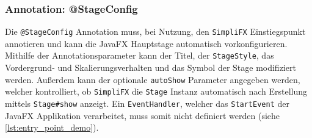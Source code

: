 \subsubsection{Annotation: @StageConfig}
Die \texttt{@StageConfig} Annotation muss, bei Nutzung, den \texttt{SimpliFX} Einstiegspunkt annotieren und kann die JavaFX Hauptstage automatisch vorkonfigurieren. Mithilfe der Annotationsparameter kann der Titel, der \texttt{StageStyle}, das Vordergrund- und Skalierungsverhalten und das Symbol der Stage modifiziert werden. Außerdem kann der optionale \texttt{autoShow} Parameter angegeben werden, welcher kontrolliert, ob \texttt{SimpliFX} die \texttt{Stage} Instanz automatisch nach Erstellung mittels \texttt{Stage\#show} anzeigt. Ein \texttt{EventHandler}, welcher das \texttt{StartEvent} der JavaFX Applikation verarbeitet, muss somit nicht definiert werden (siehe \autoref{lst:entry_point_demo}).
